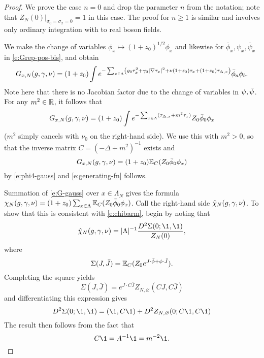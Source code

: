 \begin{proof}
We prove the case $n = 0$ and drop the parameter $n$ from the notation; note that
$Z_N(0)\big|_{\sigma_0=\sigma_x=0} = 1$ in this case. The proof for $n \ge 1$ is similar
and involves only ordinary integration with to real boson fields.

We make the change of variables $\phi_x \mapsto (1 + z_0)^{1/2} \phi_x$
and likewise for $\bar\phi_x, \psi_x, \bar\psi_x$ in \eqref{e:Grep-pos-bis}, and obtain
\begin{equation}
\label{e:Grep-pos}
G_{x,N}(g,\gamma,\nu)
	=
(1+z_0) \int e^{-\sum_{x\in\Lambda}
\left(
	g_0 \tau_x^2 + \gamma_0 |\nabla \tau_x|^2 + \nu (1+z_0) \tau_x + (1+z_0)\tau_{\Delta,x}
\right)}
\bar\phi_a \phi_b.
\end{equation}
Note here that there is no Jacobian factor due to the change of variables in $\psi, \bar\psi$.
For any $m^2 \in{\mathbb R}$, it follows that
\begin{equation}
\lbeq{GNint}
G_{x,N}(\gcc,\gamma,\nu)
    =
(1 + z_0) \int
e^{-\sum_{x\in\Lambda} (\tau_{\Delta,x} + m^2 \tau_x)}
Z_0 \phib_0 \phi_x
\end{equation}
($m^2$ simply cancels with $\nu_0$ on the right-hand side).
We use this with $m^2>0$, so that the inverse matrix $C=(-\Delta+m^2)^{-1}$ exists and
\begin{equation}
\label{e:G-gauss}
G_{x,N}(g, \gamma, \nu)
	=
(1 + z_0) \mathbb{E}_C (Z_0 \bar\phi_0 \phi_x)
\end{equation}
by \eqref{e:phi4-gauss}
and \eqref{e:generating-fn} follows.

Summation of \eqref{e:G-gauss} over $x\in \Lambda_N$ gives the formula
$\chi_N(g,\gamma,\nu) = (1+z_0)\sum_{x\in \Lambda} \mathbb{E}_C (Z_0\bar\phi_0\phi_x)$.
Call the right-hand side $\hat\chi_N(g,\gamma,\nu)$. To show that this is
consistent with \eqref{e:chibarm}, begin by noting that
\begin{equation}
\hat\chi_N(\gcc,\gamma,\nu)
	=
|\Lambda|^{-1} \frac{D^2 \Sigma(0; \1, \1)}{Z_N(0)},
\end{equation}
where
\begin{equation}
\Sigma(J, \bar J) = \mathbb{E}_C (Z_0 e^{J \cdot \bar\phi + \phi \cdot \bar J}).
\end{equation}
Completing the square yields
\begin{equation}
\Sigma(J, \bar J)
	=
e^{J \cdot C \bar J} Z_{N,\varnothing}(C J, C \bar J)
\end{equation}
and differentiating this expression gives
\begin{equation}
D^2 \Sigma(0; \1, \1)
	=
(\1, C \1) + D^2 Z_{N,\varnothing}(0; C\1, C\1)
\end{equation}
The result then follows from the fact that
\begin{equation}
C \1 = A^{-1} \1 = m^{-2} \1.
\end{equation}
\end{proof}

